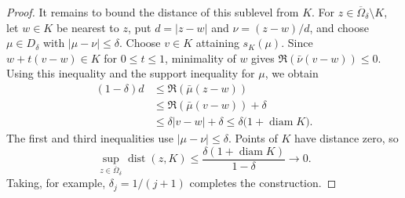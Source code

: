 \documentclass[11pt]{article}
\theoremstyle{remark}\newtheorem{remark}[theorem]{Remark}
\newcommand{\dist}{\operatorname{dist}}
\begin{document}
\begin{proof}
It remains to bound the distance of this sublevel from $K$. For
$z\in\overline\Omega_\delta\setminus K$, let $w\in K$ be nearest to $z$,
put $d=|z-w|$ and $\nu=(z-w)/d$, and choose $\mu\in D_\delta$ with
$|\mu-\nu|\le\delta$. Choose $v\in K$ attaining $s_K(\mu)$.
Since $w+t(v-w)\in K$ for $0\le t\le1$, minimality of $w$ gives
$\Re(\bar\nu(v-w))\le0$.
Using this inequality and the support inequality for $\mu$, we obtain
\[
 \begin{aligned}
 (1-\delta)d
 &\le\Re(\bar\mu(z-w))\\
 &\le\Re(\bar\mu(v-w))+\delta\\
 &\le\delta|v-w|+\delta
 \le\delta\bigl(1+\operatorname{diam}K\bigr).
 \end{aligned}
\]
The first and third inequalities use $|\mu-\nu|\le\delta$. Points of $K$
have distance zero, so
\[
 \sup_{z\in\overline\Omega_\delta}\dist(z,K)
 \le\frac{\delta(1+\operatorname{diam}K)}{1-\delta}\longrightarrow0.
\]
Taking, for example, $\delta_j=1/(j+1)$ completes the construction.
\end{proof}
\end{document}
